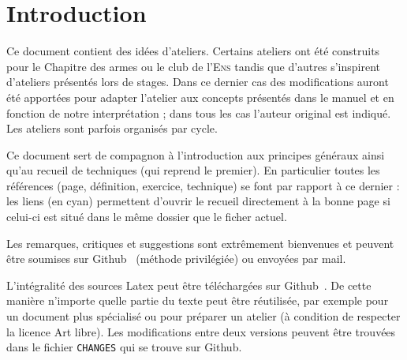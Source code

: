 \section*{Introduction}


Ce document contient des idées d'ateliers.
Certains ateliers ont été construits pour le Chapitre des armes ou le club de l'\textsc{Ens} tandis que d'autres s'inspirent d'ateliers présentés lors de stages.
Dans ce dernier cas des modifications auront été apportées pour adapter l'atelier aux concepts présentés dans le manuel et en fonction de notre interprétation ; dans tous les cas l'auteur original est indiqué.
Les ateliers sont parfois organisés par cycle.

Ce document sert de compagnon à l'introduction aux principes généraux ainsi qu'au recueil de techniques (qui reprend le premier).
En particulier toutes les références (page, définition, exercice, technique) se font par rapport à ce dernier : les liens (en cyan) permettent d'ouvrir le recueil directement à la bonne page si celui-ci est situé dans le même dossier que le ficher actuel.

Les remarques, critiques et suggestions sont extrêmement bienvenues et peuvent être soumises sur Github~\footnotemark{} (méthode privilégiée) ou envoyées par mail.

L'intégralité des sources Latex peut être téléchargées sur Github~\footnotemark{}.%
De cette manière n'importe quelle partie du texte peut être réutilisée, par exemple pour un document plus spécialisé ou pour préparer un atelier (à condition de respecter la licence Art libre).
Les modifications entre deux versions peuvent être trouvées dans le fichier \texttt{CHANGES} qui se trouve sur Github.


